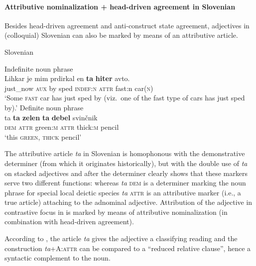 \paragraph*{Attributive nominalization + head\hyp{}driven agreement in Slovenian}
Besides head\hyp{}driven agreement and anti\hyp{}construct state agreement, adjectives in (colloquial) Slovenian can also be marked by means of an attributive article.
\begin{exe}
\ex \rm{Slovenian \citep{marusic-etal2007}}
\label{slovenian art}
\begin{xlist}
\ex \rm{Indefinite noun phrase}\\
\gll	Lihkar je mim prdirkal en \textbf{ta} \textbf{hiter} avto.\\
	just\_now \textsc{aux} by sped \textsc{indef:n} \textsc{attr} fast:n car(\textsc{n})\\
\glt	‘Some \textsc{fast} car has just sped by (viz.~one of the fast type of cars has just sped by).’ 
\ex \rm{Definite noun phrase}\\
\label{slovenian def}
\gll 	ta \textbf{ta} \textbf{zelen} \textbf{ta} \textbf{debel} svin\v{c}nik\\
	\textsc{dem} \textsc{attr} green\textsc{:m} \textsc{attr} thick\textsc{:m} pencil\\
\glt 	‘this \textsc{green}, \textsc{thick} pencil’
\end{xlist}
\end{exe}
The attributive article \textit{ta} in Slovenian is homophonous with the demonstrative determiner (from which it originates historically), but  with the double use of \textit{ta} on stacked adjectives and after the determiner clearly shows that these markers serve two different functions: whereas \textit{ta} \textsc{dem} is a determiner marking the noun phrase for special local deictic species \textit{ta} \textsc{attr} is an attributive marker (i.e., a true article) attaching to the adnominal adjective. Attribution of the adjective in contrastive focus in  is marked by means of attributive nominalization (in combination with head\hyp{}driven agreement).

According to \cite{marusic-etal2007,marusic-etal2007b}, the article \textit{ta} gives the adjective a classifying reading and the construction \textit{ta}+A:\textsc{attr} can be compared to a “reduced relative clause”, hence a syntactic complement to the noun.

